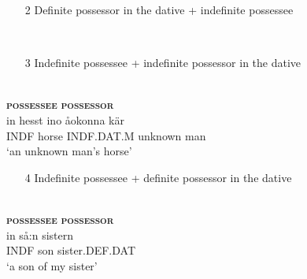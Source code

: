 \z 
\z 

\begin{enumerate}
\item[2] Definite possessor in the dative + indefinite possessee
\end{enumerate} 

\ea\label{}
\\

\z 
\z

\begin{enumerate} 
\item[3] Indefinite possessee + indefinite possessor in the dative
\end{enumerate} 

\ea 
{}\\
\glll \textbf{\textsc{possessee}} \textbf{\textsc{possessor}}\\
in  hesst  ino  åokonna  kär\\
INDF  horse  INDF.DAT.M  unknown  man\\
\glt  ‘an unknown man’s horse’
\z

\begin{enumerate}
\item[4] Indefinite possessee + definite possessor in the dative
\end{enumerate} 


\ea\label{}
\\
\glll \textbf{\textsc{possessee}} \textbf{\textsc{possessor}}\\
in  så:n  sistern\\
INDF  son  sister.DEF.DAT\\
\glt ‘a son of my sister’
\z

